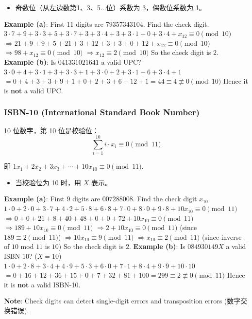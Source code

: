 \documentclass[10pt,a4paper,openany]{ctexbook}
\theoremstyle{definition}
\theoremstyle{remark}
\renewenvironment{quote}
  {\list{}{\leftmargin=1em\rightmargin=0pt\topsep=0.5pt\partopsep=0pt}\item[]}
  {\endlist}
\begin{document}
\begin{itemize}
\item 奇数位（从左边数第1、3、5...位）系数为 3，偶数位系数为 1。

\end{itemize}

\textbf{Example (a)}: First 11 digits are $79357343104$. Find the check digit.
$3\cdot7 + 9 + 3\cdot3 + 5 + 3\cdot7 + 3 + 3\cdot4 + 3 + 3\cdot1 + 0 + 3\cdot4 + x_{12} \equiv 0 \pmod{10}$
$\Rightarrow 21 + 9 + 9 + 5 + 21 + 3 + 12 + 3 + 3 + 0 + 12 + x_{12} \equiv 0 \pmod{10}$
$\Rightarrow 98 + x_{12} \equiv 0 \pmod{10}$
$\Rightarrow x_{12} \equiv 2 \pmod{10}$
So the check digit is $2$.
\textbf{Example (b)}: Is $041331021641$ a valid UPC?
$3\cdot0 + 4 + 3\cdot1 + 3 + 3\cdot3 + 1 + 3\cdot0 + 2 + 3\cdot1 + 6 + 3\cdot4 + 1$
$= 0 + 4 + 3 + 3 + 9 + 1 + 0 + 2 + 3 + 6 + 12 + 1 = 44 \equiv 4 \not\equiv 0 \pmod{10}$
Hence it is \textbf{not} a valid UPC.
\vspace{-2pt}

\subsubsection{ISBN-10 (International Standard Book Number)}

10 位数字，第 10 位是校验位：
\[
\sum_{i=1}^{10} i \cdot x_i \equiv 0 \pmod{11}
\]

即 $1x_1 + 2x_2 + 3x_3 + \cdots + 10x_{10} \equiv 0 \pmod{11}$.
\begin{itemize}
\item 当校验位为 10 时，用 $X$ 表示。

\end{itemize}

\textbf{Example (a)}: First 9 digits are $007288008$. Find the check digit $x_{10}$.
$1\cdot0 + 2\cdot0 + 3\cdot7 + 4\cdot2 + 5\cdot8 + 6\cdot8 + 7\cdot0 + 8\cdot0 + 9\cdot8 + 10x_{10} \equiv 0 \pmod{11}$
$\Rightarrow 0 + 0 + 21 + 8 + 40 + 48 + 0 + 0 + 72 + 10x_{10} \equiv 0 \pmod{11}$
$\Rightarrow 189 + 10x_{10} \equiv 0 \pmod{11}$
$\Rightarrow 2 + 10x_{10} \equiv 0 \pmod{11}$ (since $189 \equiv 2 \pmod{11}$)
$\Rightarrow 10x_{10} \equiv 9 \pmod{11}$
$\Rightarrow x_{10} \equiv 2 \pmod{11}$ (since inverse of $10$ mod $11$ is $10$)
So the check digit is $2$.
\textbf{Example (b)}: Is $084930149X$ a valid ISBN-10? ($X = 10$)
$1\cdot0 + 2\cdot8 + 3\cdot4 + 4\cdot9 + 5\cdot3 + 6\cdot0 + 7\cdot1 + 8\cdot4 + 9\cdot9 + 10\cdot10$
$= 0 + 16 + 12 + 36 + 15 + 0 + 7 + 32 + 81 + 100 = 299 \equiv 2 \not\equiv 0 \pmod{11}$
Hence it is \textbf{not} a valid ISBN-10.
\begin{quote}
\textbf{Note}: Check digits can detect single-digit errors and transposition errors (数字交换错误).

\end{quote}
\vspace{-2pt}
\end{document}
